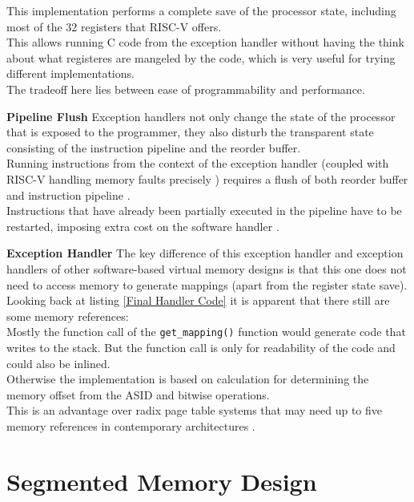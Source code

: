 This implementation performs a complete save of the processor state, including most of the
32 registers that RISC-V offers.\\
This allows running C code from the exception handler without having the think about what
registeres are mangeled by the code, which is very useful for trying different implementations.\\
The tradeoff here lies between ease of programmability and performance.

\textbf{Pipeline Flush} Exception handlers not only change the state of the processor that is
exposed to the programmer, they also disturb the transparent state consisting of the
instruction pipeline and the reorder buffer.\\
Running instructions from the context of the exception handler (coupled with RISC-V handling
memory faults precisely \cite{RISCVInstructionSet}) requires a flush of both reorder buffer
and instruction pipeline \cite{jacobVirtualMemoryContemporary1998}.\\
Instructions that have already been partially executed in the pipeline have to be restarted,
imposing extra cost on the software handler \cite{jacob1998look}.

\textbf{Exception Handler} The key difference of this exception handler and exception handlers
of other software-based virtual memory designs is that this one does not need to access
memory to generate mappings (apart from the register state save).\\
Looking back at listing \ref{Final Handler Code} it is apparent that there still are some
memory references:\\
Mostly the function call of the \texttt{get\_mapping()} function would generate code that
writes to the stack. But the function call is only for readability of the code and could also
be inlined.\\
Otherwise the implementation is based on calculation for determining the memory offset from
the ASID and bitwise operations.\\
This is an advantage over radix page table systems that may need up to five memory references
in contemporary architectures \cite{intel5LevelPaging5Level2017}.
\section{Segmented Memory Design}



